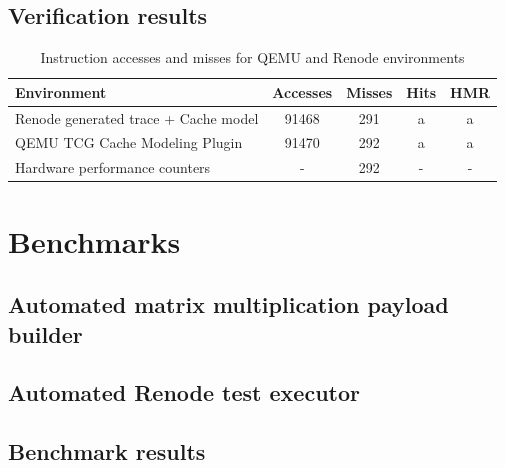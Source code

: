 \subsection{Verification results}

\begin{center}
\begin{table}[h!]
\centering
\begin{tabular}{|l|c|c|c|c|}
\hline
\textbf{Environment} & \textbf{Accesses} & \textbf{Misses} & \textbf{Hits} & \textbf{HMR} \\ \hline
Renode generated trace + Cache model    & 91468        & 291         & a & a\\ \hline
QEMU TCG Cache Modeling Plugin          & 91470        & 292         & a & a\\ \hline
Hardware performance counters          & -        & 292         & - & -\\ \hline %
\end{tabular}
\caption{Instruction accesses and misses for QEMU and Renode environments}
\label{table:cache_results}
\end{table}
\end{center}

\section{Benchmarks}
\subsection{Automated matrix multiplication payload builder}
\subsection{Automated Renode test executor} \label{sec:renodetestexecutor}
\subsection{Benchmark results}
